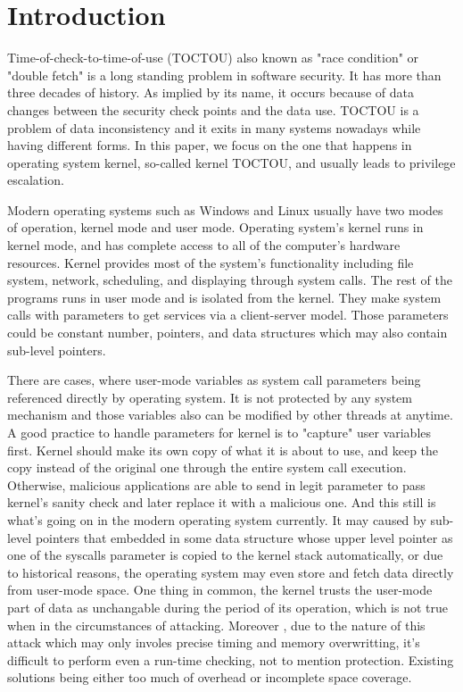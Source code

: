 
\section{Introduction}

Time-of-check-to-time-of-use (TOCTOU) also known as "race condition" or "double fetch" is a long standing problem in software security. It has more than three decades of history. As implied by its name, it occurs because of data changes between the security check points and the data use. TOCTOU is a problem of data inconsistency and it exits in many systems nowadays while having different forms. In this paper, we focus on the one that happens in operating system kernel, so-called kernel TOCTOU, and usually leads to privilege escalation.

Modern operating systems such as Windows and Linux usually have two modes of operation, kernel mode and user mode. Operating system's kernel runs in kernel mode, and has complete access to all of the computer's hardware resources. Kernel provides most of the system's functionality including file system, network, scheduling, and displaying through system calls. The rest of the programs runs in user mode and is isolated from the kernel. They make system calls with parameters to get services via a client-server model. Those parameters could be constant number, pointers, and data structures which may also contain sub-level pointers.

There are cases, where user-mode variables as system call parameters being referenced directly by operating system. It is not protected by any system mechanism and those variables also can be modified by other threads at anytime. A good practice to handle parameters for kernel is to "capture" user variables first. Kernel should make its own copy of what it is about to use, and keep the copy instead of the original one through the entire system call execution. Otherwise, malicious applications are able to send in legit parameter to pass kernel's sanity check and later replace it with a malicious one. And this still is what's going on in the modern operating system currently. It may caused by sub-level pointers that embedded in some data structure whose upper level pointer as one of the syscalls parameter is copied to the kernel stack automatically, or due to historical reasons, the operating system may even store and fetch data directly from user-mode space. One thing in common, the kernel trusts the user-mode part of data as unchangable during the period of its operation, which is not true when in the circumstances of attacking. Moreover
, due to the nature of this attack which may only involes precise timing and memory overwritting, it's difficult to perform even a run-time checking, not to mention protection. Existing solutions being either too much of overhead or incomplete space coverage.

